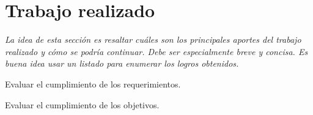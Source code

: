 
\section{Trabajo realizado}

\emph{La idea de esta sección es resaltar cuáles son los principales aportes del trabajo realizado y cómo se podría continuar. Debe ser especialmente breve y concisa. Es buena idea usar un listado para enumerar los logros obtenidos.}


Evaluar el cumplimiento de los requerimientos.

Evaluar el cumplimiento de los objetivos.



%
%



